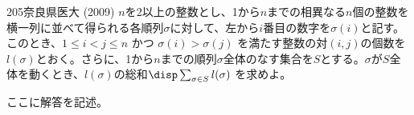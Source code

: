 \begin{thm}{205}{}{奈良県医大 (2009)}
 $n$を2以上の整数とし、1から$n$までの相異なる$n$個の整数を横一列に並べて得られる各順列$\sigma$に対して、左から$i$番目の数字を$\sigma(i)$と記す。このとき、$1\le i < j \le n$ かつ $\sigma(i)>\sigma(j)$ を満たす整数の対$(i,j)$の個数を$l(\sigma)$とおく。さらに、1から$n$までの順列$\sigma$全体のなす集合を$S$とする。$\sigma$が$S$全体を動くとき、$l(\sigma)$の総和$\disp \sum_{\sigma\in S} l(\sigma)$ を求めよ。
\end{thm}

ここに解答を記述。